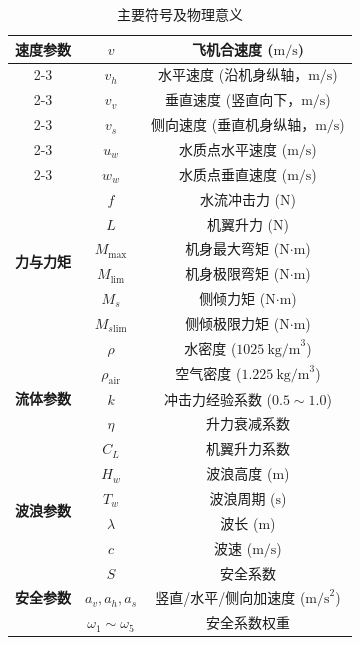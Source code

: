 \documentclass{cumcmthesis}
\begin{document}
\begin{table}[H]
\centering
\caption{主要符号及物理意义}
\label{tab:symbol}
\begin{tabular}{|c|c|c|}
\hline
\multirow{6}{*}{\textbf{速度参数}} 
& \( v \) & 飞机合速度 (\( \text{m/s} \)) \\ \cline{2-3}
& \( v_h \) & 水平速度 (沿机身纵轴，\( \text{m/s} \)) \\ \cline{2-3}
& \( v_v \) & 垂直速度 (竖直向下，\( \text{m/s} \)) \\ \cline{2-3}
& \( v_s \) & 侧向速度 (垂直机身纵轴，\( \text{m/s} \)) \\ \cline{2-3}
& \( u_w \) & 水质点水平速度 (\( \text{m/s} \)) \\ \cline{2-3}
& \( w_w \) & 水质点垂直速度 (\( \text{m/s} \)) \\
\hline
\multirow{6}{*}{\textbf{力与力矩}} 
& \( f \) & 水流冲击力 (\( \text{N} \)) \\ \cline{2-3}
& \( L \) & 机翼升力 (\( \text{N} \)) \\ \cline{2-3}
& \( M_{\text{max}} \) & 机身最大弯矩 (\( \text{N·m} \)) \\ \cline{2-3}
& \( M_{\text{lim}} \) & 机身极限弯矩 (\( \text{N·m} \)) \\ \cline{2-3}
& \( M_s \) & 侧倾力矩 (\( \text{N·m} \)) \\ \cline{2-3}
& \( M_{s\text{lim}} \) & 侧倾极限力矩 (\( \text{N·m} \)) \\
\hline
\multirow{5}{*}{\textbf{流体参数}} 
& \( \rho \) & 水密度 (\( 1025\ \text{kg/m}^3 \)) \\ \cline{2-3}
& \( \rho_{\text{air}} \) & 空气密度 (\( 1.225\ \text{kg/m}^3 \)) \\ \cline{2-3}
& \( k \) & 冲击力经验系数 (\( 0.5\sim1.0 \)) \\ \cline{2-3}
& \( \eta \) & 升力衰减系数 \\ \cline{2-3}
& \( C_L \) & 机翼升力系数 \\
\hline
\multirow{4}{*}{\textbf{波浪参数}} 
& \( H_w \) & 波浪高度 (\( \text{m} \)) \\ \cline{2-3}
& \( T_w \) & 波浪周期 (\( \text{s} \)) \\ \cline{2-3}
& \( \lambda \) & 波长 (\( \text{m} \)) \\ \cline{2-3}
& \( c \) & 波速 (\( \text{m/s} \)) \\
\hline
\multirow{3}{*}{\textbf{安全参数}} 
& \( S \) & 安全系数 \\ \cline{2-3}
& \( a_v, a_h, a_s \) & 竖直/水平/侧向加速度 (\( \text{m/s}^2 \)) \\ \cline{2-3}
& \( \omega_1 \sim \omega_5 \) & 安全系数权重 \\
\hline
\end{tabular}
\end{table}
\end{document}
